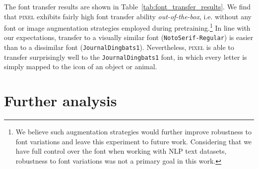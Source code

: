 \documentclass{article}
\newcommand{\model}{\textsc{pixel}\xspace}
\begin{document}
\begin{table*}[ht]
\centering
{}
\caption{Results for fine-tuning \model for POS tagging, dependency parsing (DP), and sentiment analysis on SST-2 with three different fonts: the font used in pretraining ({\footnotesize \texttt{GoNotoCurrent}}), a visually similar font ({\footnotesize \texttt{NotoSerif-Regular}}), and a highly dissimilar font ({\footnotesize\texttt{JournalDingbats1}}). We report test accuracy for POS, test LAS for DP, and validation accuracy for SST-2, each averaged over 5 runs.}
\label{tab:font_transfer_results}
\end{table*}

The font transfer results are shown in Table~\ref{tab:font_transfer_results}. We find that \model exhibits fairly high font transfer ability \emph{out-of-the-box}, i.e. without any font or image augmentation strategies employed during pretraining.\footnote{We believe such augmentation strategies would further improve robustness to font variations and leave this experiment to future work. Considering that we have full control over the font when working with NLP text datasets, robustness to font variations was not a primary goal in this work.} In line with our expectations, transfer to a visually similar font ({\footnotesize \texttt{NotoSerif-Regular}}) is easier than to a dissimilar font ({\footnotesize\texttt{JournalDingbats1}}). Nevertheless, \model is able to transfer surprisingly well to the {\footnotesize\texttt{JournalDingbats1}} font, in which every letter is simply mapped to the icon of an object or animal. 

\section{Further analysis}
\label{app:analysis}
\end{document}
